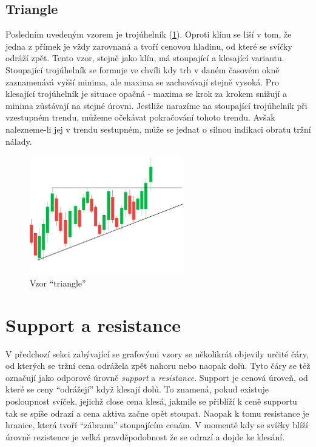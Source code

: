 \subsection{Triangle}
Posledním uvedeným vzorem je trojúhelník (\ref{fig:triangle}). Oproti klínu se liší v tom, že jedna z přímek je vždy zarovnaná a tvoří cenovou hladinu, od které se svíčky odráží zpět. Tento vzor, stejně
jako klín, má stoupající a klesající variantu. Stoupající trojúhelník se formuje ve chvíli kdy trh v daném časovém okně zaznamenává vyšší minima, ale maxima se zachovávají stejně vysoká.
Pro klesající trojúhelník je situace opačná - maxima se krok za krokem snižují a minima zůstávají na stejné úrovni. Jestliže narazíme na stoupající trojúhelník při vzestupném trendu,
můžeme očekávat pokračování tohoto trendu. Avšak nalezneme-li jej v trendu sestupném, může se jednat o silnou indikaci obratu tržní nálady.
\begin{figure}[ht]
    \centering
    \includegraphics[width=0.6\textwidth]{Figures/triangle.pdf}
    \caption{Vzor \enquote{triangle}}
    \label{fig:triangle}
\end{figure}

\clearpage
\newpage


\section{Support a resistance}
\label{sec:TrendingLines}
V předchozí sekci zabývající se grafovými vzory se několikrát objevily určité čáry, od kterých se tržní cena odrážela zpět nahoru nebo naopak dolů. Tyto čáry se též označují jako odporové
úrovně \emph{support} a \emph{resistance}. Support je cenová úroveň, od které se ceny \enquote{odrážejí} když klesají dolů. To znamená, pokud existuje posloupnost svíček, jejichž close cena
klesá, jakmile se přiblíží k ceně supportu tak se spíše odrazí a cena aktiva začne opět stoupat. Naopak k tomu resistance je hranice, která tvoří \enquote{zábranu} stoupajícím cenám.
V momentě kdy se svíčky blíží úrovně rezistence je velká pravděpodobnost že se odrazí a dojde ke klesání.

